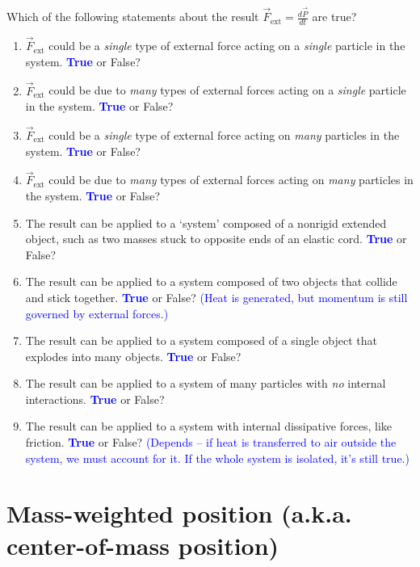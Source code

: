\documentclass[11pt, letterpaper, openany]{book}
\newenvironment{exercise}[1][Exercise]{%
  \tcolorbox[blanker, breakable, left=1em,
    before skip=1em, after skip=1em,
    borderline west={3pt}{0pt}{PhysNavy},
    colback=PhysCream,
    before upper={\textcolor{PhysNavy}{\sffamily\bfseries #1:}\space}
  ]%
}{%
  \endtcolorbox%
}
\begin{document}
\begin{exercise}[Exercise 2]
Which of the following statements about the result $\vec{F}_{\text{ext}} = \frac{d\vec{P}}{dt}$ are true?
\begin{enumerate}
    \item $\vec{F}_{\text{ext}}$ could be a \textit{single} type of external force acting on a \textit{single} particle in the system. \textbf{\textcolor{blue}{True}} or False?
    \item $\vec{F}_{\text{ext}}$ could be due to \textit{many} types of external forces acting on a \textit{single} particle in the system. \textbf{\textcolor{blue}{True}} or False?
    \item $\vec{F}_{\text{ext}}$ could be a \textit{single} type of external force acting on \textit{many} particles in the system. \textbf{\textcolor{blue}{True}} or False?
    \item $\vec{F}_{\text{ext}}$ could be due to \textit{many} types of external forces acting on \textit{many} particles in the system. \textbf{\textcolor{blue}{True}} or False?
    \item The result can be applied to a `system' composed of a nonrigid extended object, such as two masses stuck to opposite ends of an elastic cord. \textbf{\textcolor{blue}{True}} or False?
    \item The result can be applied to a system composed of two objects that collide and stick together. \textbf{\textcolor{blue}{True}} or False? \textcolor{blue}{(Heat is generated, but momentum is still governed by external forces.)}
    \item The result can be applied to a system composed of a single object that explodes into many objects. \textbf{\textcolor{blue}{True}} or False?
    \item The result can be applied to a system of many particles with \textit{no} internal interactions. \textbf{\textcolor{blue}{True}} or False?
    \item The result can be applied to a system with internal dissipative forces, like friction. \textbf{\textcolor{blue}{True}} or False? \textcolor{blue}{(Depends -- if heat is transferred to air outside the system, we must account for it. If the whole system is isolated, it's still true.)}
\end{enumerate}
\end{exercise}

\section*{Mass-weighted position (a.k.a. center-of-mass position)}
\end{document}

